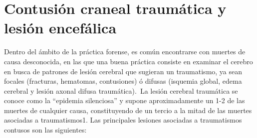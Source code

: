 \section{Contusión craneal traumática y lesión encefálica}
Dentro del ámbito de la práctica forense, es común encontrarse con muertes de causa desconocida, en las que una buena práctica consiste en examinar el cerebro en busca de patrones de lesión cerebral que sugieran un traumatismo, ya sean focales (fracturas, hematomas, contusiones) ó difusas (isquemia global, edema cerebral y lesión axonal difusa traumática).\
La lesión cerebral traumática se conoce como la “epidemia silenciosa” y supone aproximadamente un 1-2 de las muertes de cualquier causa, constituyendo de un tercio a la mitad de las muertes asociadas a traumatismos1. Las principales lesiones asociadas a traumatismos contusos son las siguientes:\
